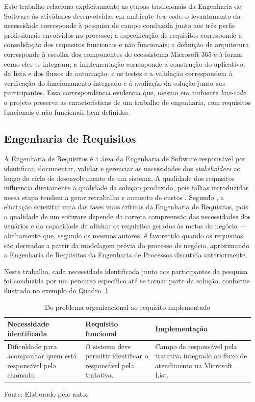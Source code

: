 Este trabalho relaciona explicitamente as etapas tradicionais
da Engenharia de Software às atividades desenvolvidas em
ambiente \textit{low-code}: o levantamento da necessidade
corresponde à pesquisa de campo conduzida junto aos três
perfis profissionais envolvidos no processo; a especificação
de requisitos corresponde à consolidação dos requisitos
funcionais e não funcionais; a definição de arquitetura
corresponde à escolha dos componentes do ecossistema
Microsoft 365 e à forma como eles se integram; a
implementação corresponde à construção do aplicativo, da
lista e dos fluxos de automação; e os testes e a validação
correspondem à verificação do funcionamento integrado e à
avaliação da solução junto aos participantes. Essa
correspondência evidencia que, mesmo em ambiente
\textit{low-code}, o projeto preserva as características de
um trabalho de engenharia, com requisitos funcionais e não
funcionais bem definidos.

\subsection{Engenharia de Requisitos}

A Engenharia de Requisitos é a área da Engenharia de Software
responsável por identificar, documentar, validar e gerenciar
as necessidades dos \textit{stakeholders} ao longo do ciclo
de desenvolvimento de um sistema. A qualidade dos requisitos
influencia diretamente a qualidade da solução produzida, pois
falhas introduzidas nessa etapa tendem a gerar retrabalho e
aumento de custos \cite{Alves2022}. Segundo
\cite{CarvalhoJunior2022}, a elicitação constitui uma das
fases mais críticas da Engenharia de Requisitos, pois a
qualidade de um software depende da correta compreensão das
necessidades dos usuários e da capacidade de alinhar os
requisitos gerados às metas do negócio --- alinhamento que,
segundo os mesmos autores, é favorecido quando os requisitos
são derivados a partir da modelagem prévia do processo de
negócio, aproximando a Engenharia de Requisitos da Engenharia
de Processos discutida anteriormente.

Neste trabalho, cada necessidade identificada junto aos
participantes da pesquisa foi conduzida por um percurso
específico até se tornar parte da solução, conforme
ilustrado no exemplo do Quadro~\ref{quadro:necessidade-requisito}.

\begin{table}[H]
\caption{Do problema organizacional ao requisito
implementado}
\label{quadro:necessidade-requisito}
\centering
\begin{tabular}{p{3.4cm} p{3.9cm} p{4.5cm}}
\hline
\textbf{Necessidade identificada} & \textbf{Requisito
funcional} & \textbf{Implementação} \\
\hline
Dificuldade para acompanhar quem está responsável pelo
chamado. & O sistema deve permitir identificar o responsável
pela tratativa. & Campo de responsável pela tratativa
integrado ao fluxo de atendimento na Microsoft List. \\
\hline
\end{tabular}
\raggedright
\par
{\fontsize{10}{12}\selectfont Fonte: Elaborado pelo autor}
\end{table}

